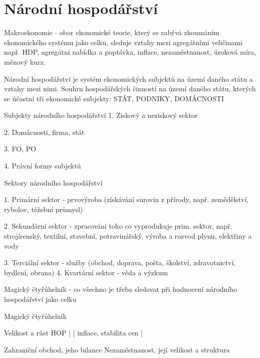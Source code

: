 \chapter{Národní hospodářství}

Makroekonomie - obor ekonomické teorie, který se zabývá zkoumáním ekonomického
systému jako celku, sleduje vztahy mezi agregátními veličinami např. HDP, agregátní nabídka
a poptávka, inflace, nezaměstnanost, úroková míra, měnový kurz.

Národní hospodářství je systém ekonomických subjektů na území daného státu a vztahy
mezi nimi. Souhrn hospodářských činností na území daného státu, kterých se účastní tři
ekonomické subjekty: STÁT, PODNIKY, DOMÁCNOSTI

Subjekty národního hospodářství
1. Ziskový a neziskový sektor

2. Domácnosti, firma, stát

3. FO, PO

4. Právní formy subjektů

Sektory národního hospodářství

1. Primární sektor - prvovýroba (získávání surovin z přírody, např. zemědělství, rybolov,
těžební průmysl)

2. Sekundární sektor - zpracování toho co vyprodukuje prim. sektor, např. strojírenský,
textilní, stavební, potravinářský, výroba a rozvod plynu, elektřiny a vody

3. Terciální sektor - služby (obchod, doprava, pošta, školství, zdravotnictví, bydlení, obrana)
4. Kvartární sektor - věda a výzkum

Magický čtyřúhelník - co všechno je třeba sledovat při hodnocení národního hospodářství
jako celku



Magický čtyřůhelník







Velikost a růst HOP | | inflace, stabilita cen |













Zahraniční obchod, jeho bilance Nezaměstnanost, její velikost
a struktura









